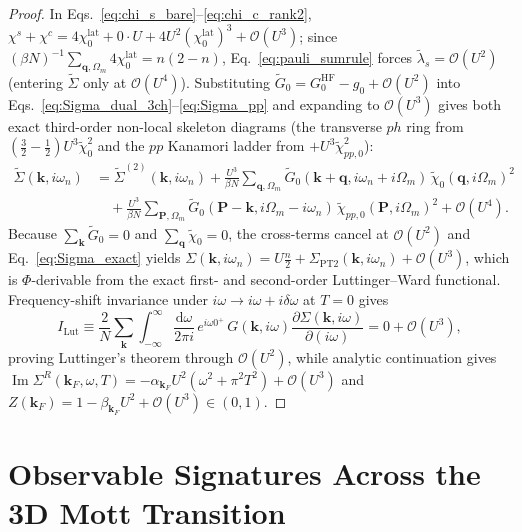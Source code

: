 \documentclass[11pt,a4paper]{article}
\numberwithin{equation}{section}
\theoremstyle{plain}
\theoremstyle{definition}
\providecommand{\vk}{\mathbf{k}}
\providecommand{\vq}{\mathbf{q}}
\providecommand{\vP}{\mathbf{P}}
\providecommand{\im}{\operatorname{Im}}
\providecommand{\dd}{\mathrm{d}}
\begin{document}
\begin{proof}
In Eqs.~\eqref{eq:chi_s_bare}--\eqref{eq:chi_c_rank2},
$\chi^s + \chi^c = 4\chi_0^{\mathrm{lat}} + 0\cdot U + 4U^2(\chi_0^{\mathrm{lat}})^3 + \mathcal{O}(U^3)$;
since $(\beta N)^{-1}\sum_{\vq,\Omega_m} 4\chi_0^{\mathrm{lat}} = n(2-n)$,
Eq.~\eqref{eq:pauli_sumrule} forces $\tilde{\lambda}_s = \mathcal{O}(U^2)$ (entering
$\tilde{\Sigma}$ only at $\mathcal{O}(U^4)$). Substituting
$\tilde{G}_0 = G_0^{\mathrm{HF}} - g_0 + \mathcal{O}(U^2)$ into
Eqs.~\eqref{eq:Sigma_dual_3ch}--\eqref{eq:Sigma_pp} and expanding to $\mathcal{O}(U^3)$
gives both exact third-order non-local skeleton diagrams (the transverse $ph$ ring from
$(\frac{3}{2}-\frac{1}{2})U^3\tilde{\chi}_0^2$ and the $pp$ Kanamori ladder from
$+U^3\tilde{\chi}_{pp,0}^2$):
\begin{equation}
\begin{split}
    \tilde{\Sigma}(\vk,i\omega_n)
    &= \tilde{\Sigma}^{(2)}(\vk,i\omega_n)
       + \frac{U^3}{\beta N}\sum_{\vq,\Omega_m}
         \tilde{G}_0(\vk+\vq,i\omega_n+i\Omega_m)\,\tilde{\chi}_0(\vq,i\Omega_m)^2 \\
    &\quad + \frac{U^3}{\beta N}\sum_{\vP,\Omega_m}
         \tilde{G}_0(\vP-\vk,i\Omega_m-i\omega_n)\,\tilde{\chi}_{pp,0}(\vP,i\Omega_m)^2
       + \mathcal{O}(U^4).
\end{split}
\label{eq:weak_O3}
\end{equation}
Because $\sum_{\vk}\tilde{G}_0 = 0$ and $\sum_{\vq}\tilde{\chi}_0 = 0$, the cross-terms
cancel at $\mathcal{O}(U^2)$ and Eq.~\eqref{eq:Sigma_exact} yields
$\Sigma(\vk,i\omega_n) = U\frac{n}{2} + \Sigma_{\mathrm{PT2}}(\vk,i\omega_n) + \mathcal{O}(U^3)$,
which is $\Phi$-derivable from the exact first- and second-order Luttinger--Ward
functional. Frequency-shift invariance under $i\omega \to i\omega + i\delta\omega$ at
$T = 0$ gives
\begin{equation}
    I_{\mathrm{Lut}} \equiv \frac{2}{N}\sum_{\vk} \int_{-\infty}^{\infty} \frac{\dd\omega}{2\pi i}\,
        e^{i\omega 0^+}\, G(\vk,i\omega)\frac{\partial\Sigma(\vk,i\omega)}{\partial(i\omega)}
    = 0 + \mathcal{O}(U^3),
    \label{eq:I_Lut}
\end{equation}
proving Luttinger's theorem through $\mathcal{O}(U^2)$, while analytic continuation gives
$\im\Sigma^R(\vk_F,\omega,T) = -\alpha_{\vk_F}U^2(\omega^2 + \pi^2 T^2) + \mathcal{O}(U^3)$
and $Z(\vk_F) = 1 - \beta_{\vk_F}U^2 + \mathcal{O}(U^3) \in (0,1)$.
\end{proof}

\section{Observable Signatures Across the 3D Mott Transition}
\label{sec:predictions}
\end{document}
